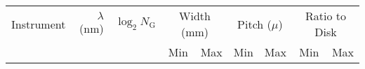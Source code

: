\documentclass{article}
\begin{document}
\begin{tabular}{lrrrrrrrr}
    \hline
    Instrument & $\lambda$ (nm) & $\log_2 N_{\mathrm{G}}$ &
    \multicolumn{2}{c}{Width (mm)}& \multicolumn{2}{c}{Pitch ($\mu$)}
    & \multicolumn{2}{c}{Ratio to Disk}\\
               & & & Min & Max & Min & Max & Min & Max\\
    \hline
\end{tabular}
\end{document}
